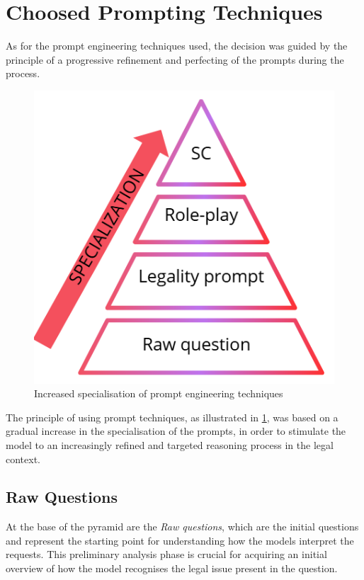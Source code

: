 \section{Choosed Prompting Techniques}
As for the prompt engineering techniques used, the decision was guided by the principle of a progressive refinement and perfecting of the prompts during the process.
\begin{figure}[H]
    \centering
    \includegraphics[width=0.7\linewidth]{Figures/piramide.png}
    \caption{Increased specialisation of prompt engineering techniques}
    \label{fig:pyramide}
\end{figure}
The principle of using prompt techniques, as illustrated in \ref{fig:pyramide}, was based on a gradual increase in the specialisation of the prompts, in order to stimulate the model to an increasingly refined and targeted reasoning process in the legal context. 
\subsection{Raw Questions}
At the base of the pyramid are the \textit{Raw questions}, which are the initial questions and represent the starting point for understanding how the models interpret the requests. This preliminary analysis phase is crucial for acquiring an initial overview of how the model recognises the legal issue present in the question.
